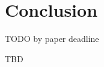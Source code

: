 \documentclass[acmsmall,review,authorversion]{acmart}
\begin{document}
\section{Conclusion}

TODO by paper deadline

\begin{acks}
TBD
\end{acks}



\end{document}
